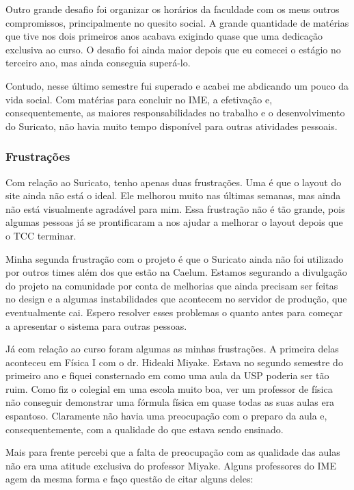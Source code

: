 \documentclass[titlepage,a4paper]{article}
\newcommand{\suricato}{Suricato}
\begin{document}
Outro grande desafio foi organizar os horários da faculdade com os meus outros compromissos, principalmente no quesito social. A grande quantidade de matérias que tive nos dois primeiros anos acabava exigindo quase que uma dedicação exclusiva ao curso. O desafio foi ainda maior depois que eu comecei o estágio no terceiro ano, mas ainda conseguia superá-lo.

Contudo, nesse último semestre fui superado e acabei me abdicando um pouco da vida social. Com matérias para concluir no IME, a efetivação e, consequentemente, as maiores responsabilidades no trabalho e o desenvolvimento do \suricato{}, não havia muito tempo disponível para outras atividades pessoais.

\subsubsection*{Frustrações}

Com relação ao \suricato{}, tenho apenas duas frustrações. Uma é que o layout do site ainda não está o ideal. Ele melhorou muito nas últimas semanas, mas ainda não está visualmente agradável para mim. Essa frustração não é tão grande, pois algumas pessoas já se prontificaram a nos ajudar a melhorar o layout depois que o TCC terminar.

Minha segunda frustração com o projeto é que o \suricato{} ainda não foi utilizado por outros times além dos que estão na Caelum. Estamos segurando a divulgação do projeto na comunidade por conta de melhorias que ainda precisam ser feitas no design e a algumas instabilidades que acontecem no servidor de produção, que eventualmente cai. Espero resolver esses problemas o quanto antes para começar a apresentar o sistema para outras pessoas.

Já com relação ao curso foram algumas as minhas frustrações.  A primeira delas aconteceu em Física I com o dr. Hideaki Miyake. Estava no segundo semestre do primeiro ano e fiquei consternado em como uma aula da USP poderia ser tão ruim. Como fiz o colegial em uma escola muito boa, ver um professor de física não conseguir demonstrar uma fórmula física em quase todas as suas aulas era espantoso. Claramente não havia uma preocupação com o preparo da aula e, consequentemente, com a qualidade do que estava sendo ensinado.

Mais para frente percebi que a falta de preocupação com as qualidade das aulas não era uma atitude exclusiva do professor Miyake. Alguns professores do IME agem da mesma forma e faço questão de citar alguns deles:
\end{document}
